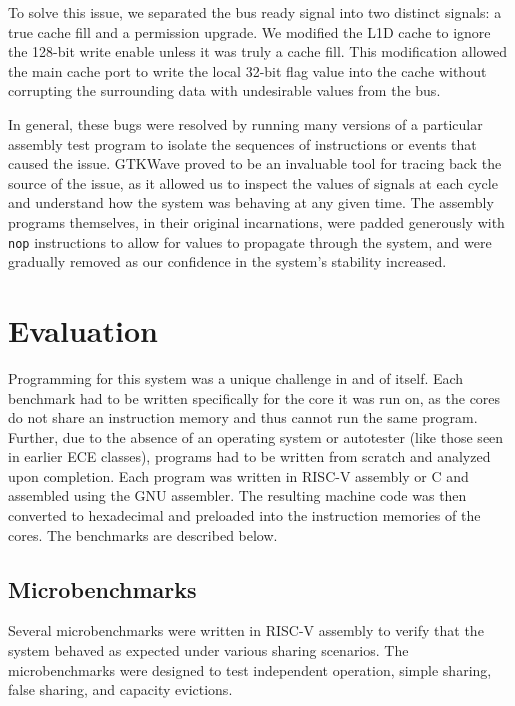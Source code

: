 \documentclass[10pt, compsoc]{IEEEtran}
\begin{document}
To solve this issue, we separated the bus ready signal into two distinct signals: a true cache fill and a permission upgrade. We modified the L1D cache to ignore the 128-bit write enable unless it was truly a cache fill. This modification allowed the main cache port to write the local 32-bit flag value into the cache without corrupting the surrounding data with undesirable values from the bus. 



In general, these bugs were resolved by running many versions of a particular assembly test program to isolate the sequences of instructions or events that caused the issue. GTKWave proved to be an invaluable tool for tracing back the source of the issue, as it allowed us to inspect the values of signals at each cycle and understand how the system was behaving at any given time. The assembly programs themselves, in their original incarnations, were padded generously with \texttt{nop} instructions to allow for values to propagate through the system, and were gradually removed as our confidence in the system's stability increased.



\section{Evaluation}\label{sec:Microbenchmarks and Evaluation}

Programming for this system was a unique challenge in and of itself. Each benchmark had to be written specifically for the core it was run on, as the cores do not share an instruction memory and thus cannot run the same program. Further, due to the absence of an operating system or autotester (like those seen in earlier ECE classes), programs had to be written from scratch and analyzed upon completion. Each program was written in RISC-V assembly or C and assembled using the GNU assembler. The resulting machine code was then converted to hexadecimal and preloaded into the instruction memories of the cores. The benchmarks are described below.



\subsection{Microbenchmarks}

Several microbenchmarks were written in RISC-V assembly to verify that the system behaved as expected under various sharing scenarios. The microbenchmarks were designed to test independent operation, simple sharing, false sharing, and capacity evictions.
\end{document}
